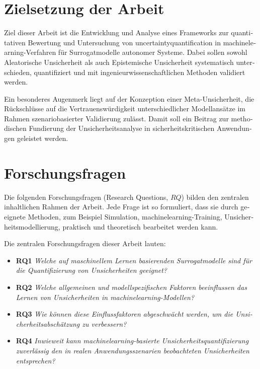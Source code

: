 \begin{otherlanguage}{ngerman}
\section{Zielsetzung der Arbeit}

Ziel dieser Arbeit ist die Entwicklung und Analyse eines Frameworks zur quantitativen Bewertung und Untersuchung von \gls{uncertaintyquantification} in \gls{machinelearning}-Verfahren für Surrogatmodelle autonomer Systeme. Dabei sollen sowohl \gls{Aleatorische Unsicherheit} als auch \gls{Epistemische Unsicherheit} systematisch unterschieden, quantifiziert und mit ingenieurwissenschaftlichen Methoden validiert werden.

Ein besonderes Augenmerk liegt auf der Konzeption einer Meta-Unsicherheit, die Rückschlüsse auf die Vertrauenswürdigkeit unterschiedlicher Modellansätze im Rahmen szenariobasierter Validierung zulässt. Damit soll ein Beitrag zur methodischen Fundierung der Unsicherheitsanalyse in sicherheitskritischen Anwendungen geleistet werden.

\section{Forschungsfragen}

Die folgenden Forschungsfragen (Research Questions, $RQ$) bilden den zentralen inhaltlichen Rahmen der Arbeit. Jede Frage ist so formuliert, dass sie durch geeignete Methoden, zum Beispiel Simulation, \gls{machinelearning}-Training, Unsicherheitsmodellierung, praktisch und theoretisch bearbeitet werden kann. 

Die zentralen Forschungsfragen dieser Arbeit lauten:

\begin{itemize}
  \item \textbf{RQ1} \textit{Welche auf maschinellem Lernen basierenden Surrogatmodelle sind für die Quantifizierung von Unsicherheiten geeignet?}
  \item \textbf{RQ2} \textit{Welche allgemeinen und modellspezifischen Faktoren beeinflussen das Lernen von Unsicherheiten in \gls{machinelearning}-Modellen?}
  \item \textbf{RQ3} \textit{Wie können diese Einflussfaktoren abgeschwächt werden, um die Unsicherheitsabschätzung zu verbessern?}
  \item \textbf{RQ4} \textit{Inwieweit kann \gls{machinelearning}-basierte Unsicherheitsquantifizierung zuverlässig den in realen Anwendungsszenarien beobachteten Unsicherheiten entsprechen?}
\end{itemize}


\end{otherlanguage}
